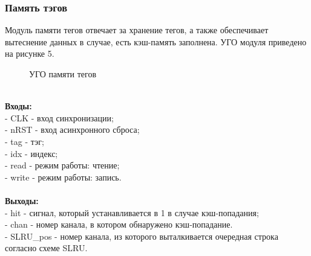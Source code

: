 \documentclass[13pt]{article}
\begin{document}
	\subsubsection{Память тэгов}
	Модуль памяти тегов отвечает за хранение тегов, а также обеспечивает вытеснение данных в случае, есть кэш-память заполнена. УГО модуля приведено на рисунке 5.\\
	\begin{figure}[h!]
		\caption{УГО памяти тегов}
	\end{figure}\\
	\textbf{Входы:}\\
	- CLK - вход синхронизации;\\
	- nRST - вход асинхронного сброса;\\
	- tag - тэг;\\
	- idx - индекс;\\
	- read - режим работы: чтение;\\
	- write - режим работы: запись.\\\\
	\textbf{Выходы:}\\
	- hit - сигнал, который устанавливается в 1 в случае кэш-попадания;\\
	- chan - номер канала, в котором обнаружено кэш-попадание.\\
	- SLRU\_pos - номер канала, из которого выталкивается очередная строка согласно схеме SLRU.
	
\end{document}
